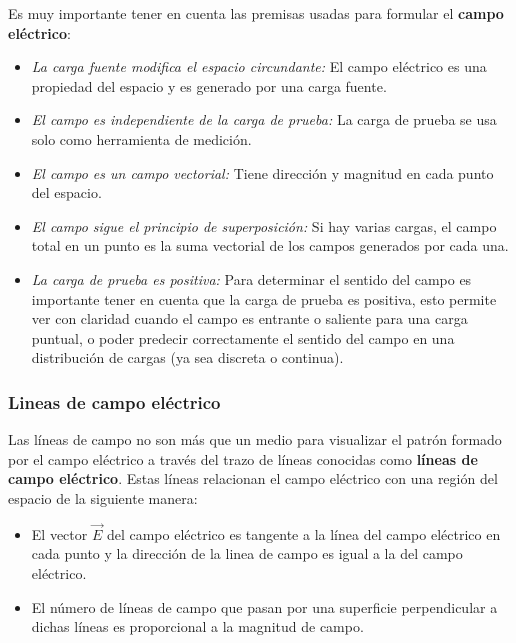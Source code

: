 Es muy importante tener en cuenta las premisas usadas para formular el \textbf{campo eléctrico}:
\begin{itemize}
    \item \textit{La carga fuente modifica el espacio circundante:} El campo eléctrico es una propiedad del espacio y es generado por una carga fuente.
    \item \textit{El campo es independiente de la carga de prueba:} La carga de prueba se usa solo como herramienta de medición.
    \item \textit{El campo es un campo vectorial:} Tiene dirección y magnitud en cada punto del espacio.
    \item \textit{El campo sigue el principio de superposición:} Si hay varias cargas, el campo total en un punto es la suma vectorial de los campos generados por cada una.
    \item \textit{La carga de prueba es positiva:} Para determinar el sentido del campo es importante tener en cuenta que la carga de prueba es positiva, esto permite ver con claridad cuando el campo es entrante o saliente para una carga puntual, o poder predecir correctamente el sentido del campo en una distribución de cargas (ya sea discreta o continua).
\end{itemize}

\subsubsection{Lineas de campo eléctrico}

Las líneas de campo no son más que un medio para visualizar el patrón formado por el campo eléctrico a través del trazo de líneas conocidas como \textbf{líneas de campo eléctrico}. Estas líneas relacionan el campo eléctrico con una región del espacio de la siguiente manera:
\begin{itemize}
    \item El vector \(\vec{E}\) del campo eléctrico es tangente a la línea del campo eléctrico en cada punto y la dirección de la linea de campo es igual a la del campo eléctrico.
    \item El número de líneas de campo que pasan por una superficie perpendicular a dichas líneas es proporcional a la magnitud de campo.
\end{itemize}

